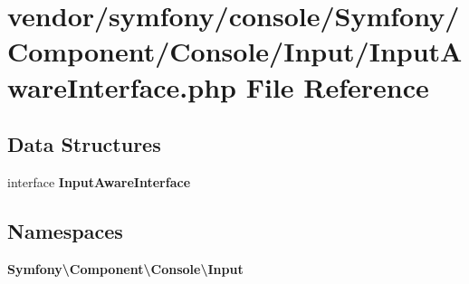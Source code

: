 \section{vendor/symfony/console/\+Symfony/\+Component/\+Console/\+Input/\+Input\+Aware\+Interface.php File Reference}
\label{_input_aware_interface_8php}
\subsection*{Data Structures}
\begin{DoxyCompactItemize}
\item 
interface {\bf Input\+Aware\+Interface}
\end{DoxyCompactItemize}
\subsection*{Namespaces}
\begin{DoxyCompactItemize}
\item 
 {\bf Symfony\textbackslash{}\+Component\textbackslash{}\+Console\textbackslash{}\+Input}
\end{DoxyCompactItemize}
